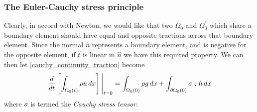 \documentclass[11pt,a4paper]{memoir}
\newcommand{\omn}{{\Omega_0}}
\newcommand{\pomn}{{\partial\Omega_0}}
\begin{document}
\subsubsection{The Euler-Cauchy stress principle}
Clearly, in accord with Newton, we would like that two $\Omega_0$ and $\Omega_0^\prime$
which share a boundary element should have equal and opposite tractions across that boundary element.
Since the normal $\hat{n}$ represents a boundary element, and is negative for the opposite element, if $\hat{t}$ is linear in $\hat{n}$ we have this required
property. We can then let \eqref{cauchy_continuity_traction} become
\begin{equation}\label{cauchy_continuity}
    \eval{\frac{d}{dt}\left[\int_{\Omega_0(t)}\rho u\,dx\right]}_{t=0} = \int_{\omn(0)} \rho g\,dx + \int_{\pomn(0)}\sigma:\hat{n}\,dx
\end{equation}
where $\sigma$ is termed the \textit{Cauchy stress tensor}.


\end{document}
